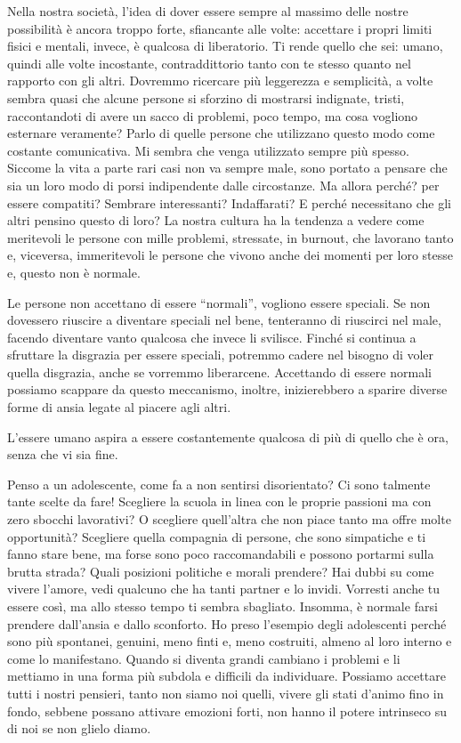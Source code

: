 \documentclass[12pt]{book} %
\begin{document}
Nella nostra società, l'idea di dover essere sempre al massimo delle nostre possibilità è ancora
troppo forte, sfiancante alle volte: accettare i propri limiti fisici e mentali, invece, è qualcosa di liberatorio. Ti
rende quello che sei: umano, quindi alle volte incostante, contraddittorio tanto con te stesso quanto nel rapporto con
gli altri. Dovremmo ricercare più
leggerezza e semplicità, a volte sembra quasi che alcune persone si sforzino di mostrarsi indignate, tristi,
raccontandoti di avere un sacco di problemi, poco tempo, ma cosa vogliono esternare veramente? Parlo di quelle persone
che utilizzano questo modo come costante comunicativa. Mi sembra che venga utilizzato sempre più spesso. Siccome la vita
a parte rari casi non va sempre male, sono portato a pensare che sia un loro modo di porsi indipendente dalle
circostanze. Ma allora perché? per essere compatiti? Sembrare interessanti? Indaffarati? E perché necessitano che gli
altri pensino questo di loro? La nostra cultura ha la tendenza a vedere come meritevoli le persone con mille problemi,
stressate, in burnout, che lavorano tanto e, viceversa, immeritevoli le persone che vivono anche dei momenti per loro
stesse e, questo non è normale.

Le persone non accettano di essere “normali”, vogliono essere speciali. Se non dovessero riuscire a diventare speciali
nel bene, tenteranno di riuscirci nel male, facendo diventare vanto qualcosa che invece li svilisce. Finché si
continua a sfruttare la disgrazia per essere speciali, potremmo cadere nel bisogno di voler quella disgrazia, anche se vorremmo
liberarcene. Accettando di essere normali possiamo scappare da questo meccanismo, inoltre, inizierebbero a sparire
diverse forme di ansia legate al piacere agli altri. 

L'essere umano aspira a essere costantemente qualcosa di più di quello che è ora, senza che vi sia fine.

Penso a un adolescente, come fa a non sentirsi disorientato? Ci sono talmente tante scelte da fare! Scegliere la scuola
in linea con le proprie passioni ma con zero sbocchi lavorativi? O scegliere quell'altra che non
piace tanto ma offre molte opportunità? Scegliere quella compagnia di persone, che sono simpatiche e ti fanno stare
bene, ma forse sono poco raccomandabili e possono portarmi sulla brutta strada? Quali posizioni politiche e morali prendere?  Hai dubbi su come vivere l'amore, vedi qualcuno che ha tanti partner e lo invidi.
Vorresti anche tu essere così, ma allo stesso tempo ti sembra sbagliato. Insomma, è normale farsi prendere
dall'ansia e dallo sconforto. Ho preso l'esempio degli adolescenti perché
sono più spontanei, genuini, meno finti e, meno costruiti, almeno al loro interno e come lo manifestano. Quando si
diventa grandi cambiano i problemi e li mettiamo in una forma più subdola e difficili da individuare. Possiamo accettare
tutti i nostri pensieri, tanto non siamo noi quelli, vivere gli stati d'animo fino in fondo, sebbene possano attivare emozioni forti, non hanno il potere intrinseco su di noi se non glielo diamo.
\end{document}
